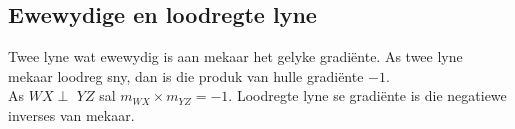 \subsection*{Ewewydige en loodregte lyne}    
% 
Twee lyne wat ewewydig is aan mekaar het gelyke gradi\"ente. As twee lyne mekaar loodreg sny, dan is die produk van hulle gradi\"ente $-1$. \\

As $WX \perp $ $ YZ$ sal $m_{WX} \times m_{YZ} = -1$. Loodregte lyne se gradi\"ente is die negatiewe inverses van mekaar.

\par
{}

